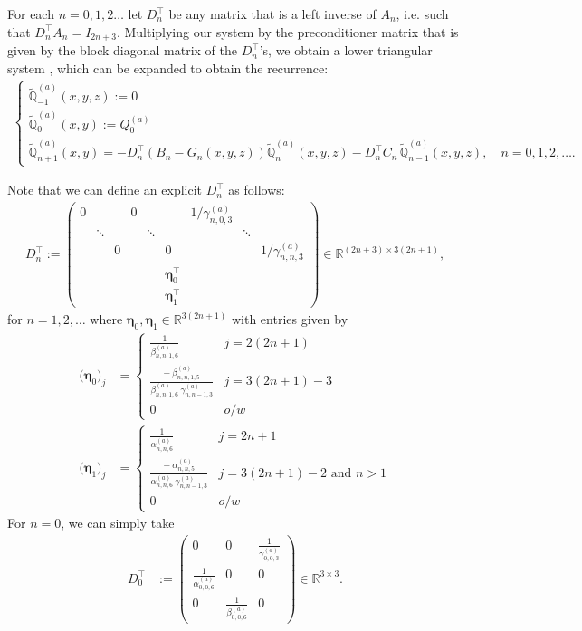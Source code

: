 \documentclass[11pt, oneside]{article}   	%
\newcommand{\R}{\mathbb{R}}
\newcommand{\Dnt}{D^\top_n}
\newcommand{\scop}{Q}
\newcommand{\scopa}{\scop^{(a)}}
\newcommand{\bigscopt}{\mathbb{\tilde{Q}}}
\newcommand{\bigscopta}{\bigscopt^{(a)}}
\newcommand{\alphaa}{\alpha^{(a)}}
\newcommand{\betaa}{\beta^{(a)}}
\newcommand{\gammaa}{\gamma^{(a)}}
\begin{document}
For each $n = 0,1,2\dots$ let $\Dnt$ be any matrix that is a left inverse of $A_n$, i.e. such that $\Dnt A_n = I_{2n+3}$. Multiplying our system by the preconditioner matrix that is given by the block diagonal matrix of the $\Dnt$'s, we obtain a lower triangular system \cite[p78]{dunkl2014orthogonal}, which can be expanded to obtain the recurrence:
\begin{align*}
	\begin{cases}
		\bigscopta_{-1}(x,y,z) := 0 \\
		\bigscopta_{0}(x,y) := \scopa_0 \\
		\bigscopta_{n+1}(x,y) = -\Dnt (B_n-G_n(x,y,z)) \bigscopta_n(x,y,z) - \Dnt C_n  \, \bigscopta_{n-1}(x,y,z), \quad n = 0,1,2,\dots.
	\end{cases}
\end{align*}

Note that we can define an explicit \(\Dnt\) as follows:
\begin{align*}
	\Dnt := 
		\begin{pmatrix}
			0 & & & 0 & & & 1 / \gammaa_{n,0,3} & & \\
			& \ddots & & & \ddots & & & \ddots \\
			& & 0 & & & 0 & & & 1 / \gammaa_{n,n,3}  \\
			& & & & & \bm{\eta}^\top_{0} & & & \\
			& & & & & \bm{\eta}^\top_{1} & & &
		\end{pmatrix} \in \R^{(2n+3)\times3(2n+1)},
\end{align*}
for $n = 1, 2, \dots$ where $\bm{\eta}_{0}, \bm{\eta}_{1} \in \R^{3(2n+1)}$ with entries given by 
\begin{align*}
	\big(\bm{\eta}_{0}\big)_j &= 
		\begin{cases}
			\frac{1}{\betaa_{n,n,1,6}} & j = 2(2n+1) \\
			\frac{- \: \betaa_{n,n,1,5}}{\betaa_{n,n,1,6} \: \gammaa_{n, n-1, 3}} & j = 3(2n+1) - 3 \\
			0 & o/w
		\end{cases} \\
	\big(\bm{\eta}_{1}\big)_j &= 
		\begin{cases}
			\frac{1}{\alphaa_{n,n,6}} & j = 2n+1 \\
			\frac{- \: \alphaa_{n,n,5}}{\alphaa_{n,n,6} \: \gammaa_{n, n-1, 3}} & j = 3(2n+1) - 2  \text{ and } n > 1 \\
			0 & o/w
		\end{cases}
\end{align*}
For $n=0$, we can simply take
\begin{align*}
	D^\top_0 &:= 
		\begin{pmatrix}
			0 & 0 & \frac{1}{\gammaa_{0,0,3}} \\
			\frac{1}{\alphaa_{0,0,6}} & 0 & 0 \\
			0 & \frac{1}{\betaa_{0,0,6}} & 0
		\end{pmatrix} \in \R^{3\times3}.
\end{align*}
\end{document}
